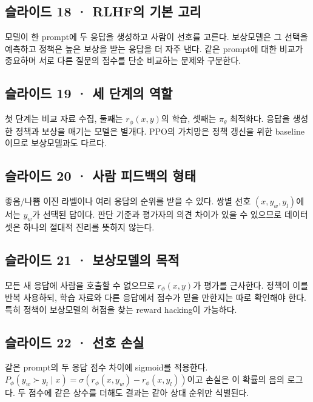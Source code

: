 \documentclass[11pt,a4paper]{article}
\begin{document}
\subsection{슬라이드 18 · RLHF의 기본 고리}

모델이 한 prompt에 두 응답을 생성하고 사람이 선호를 고른다. 보상모델은 그 선택을 예측하고 정책은 높은 보상을 받는 응답을 더 자주 낸다. 같은 prompt에 대한 비교가 중요하며 서로 다른 질문의 점수를 단순 비교하는 문제와 구분한다.\par

\subsection{슬라이드 19 · 세 단계의 역할}

첫 단계는 비교 자료 수집, 둘째는 $r_\phi(x,y)$의 학습, 셋째는 $\pi_\theta$ 최적화다. 응답을 생성한 정책과 보상을 매기는 모델은 별개다. PPO의 가치망은 정책 갱신을 위한 baseline이므로 보상모델과도 다르다.\par

\subsection{슬라이드 20 · 사람 피드백의 형태}

좋음/나쁨 이진 라벨이나 여러 응답의 순위를 받을 수 있다. 쌍별 선호 $(x,y_w,y_l)$에서는 $y_w$가 선택된 답이다. 판단 기준과 평가자의 의견 차이가 있을 수 있으므로 데이터셋은 하나의 절대적 진리를 뜻하지 않는다.\par

\subsection{슬라이드 21 · 보상모델의 목적}

모든 새 응답에 사람을 호출할 수 없으므로 $r_\phi(x,y)$가 평가를 근사한다. 정책이 이를 반복 사용하되, 학습 자료와 다른 응답에서 점수가 믿을 만한지는 따로 확인해야 한다. 특히 정책이 보상모델의 허점을 찾는 reward hacking이 가능하다.\par

\subsection{슬라이드 22 · 선호 손실}

같은 prompt의 두 응답 점수 차이에 sigmoid를 적용한다. $P_\phi(y_w\succ y_l\mid x)=\sigma(r_\phi(x,y_w)-r_\phi(x,y_l))$이고 손실은 이 확률의 음의 로그다. 두 점수에 같은 상수를 더해도 결과는 같아 상대 순위만 식별된다.\par
\end{document}
